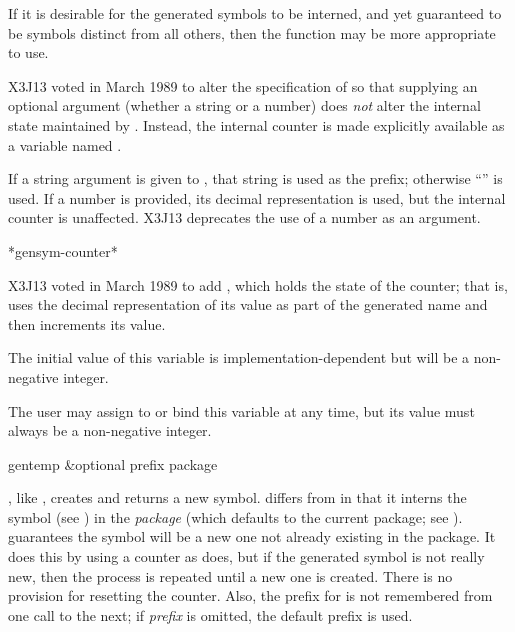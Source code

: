 \begin{defun}[Function]
If it is desirable
for the generated symbols to be interned, and yet guaranteed to be
symbols distinct from all others,
then the function 
may be more appropriate to use.

\begin{newer}
X3J13 voted in March 1989 
to alter the specification of  so that supplying an
optional argument (whether a string or a number) does {\it not} alter
the internal state maintained by .
Instead, the internal
counter is made explicitly available as a variable named .

If a string argument is given to , that string is used as the prefix;
otherwise ``'' is used.  If a number is provided, its decimal
representation is used, but the internal counter is unaffected.
X3J13 deprecates the use of a number as an argument.
\end{newer}
\end{defun}

\begin{newer}
\begin{defun}[Variable]
*gensym-counter*

X3J13 voted in March 1989 
to add , which
holds the state of the  counter; that is, 
uses the decimal representation of its value as part of the generated name
and then increments its value.

The initial value of this variable is implementation-dependent
but will be a non-negative integer.

The user may assign to or bind this variable at any time, but its value
must always be a non-negative integer.
\end{defun}
\end{newer}

\begin{defun}[Function]
gentemp &optional prefix package

, like , creates and returns a new symbol.
 differs from  in that it interns the symbol
(see ) in the {\it package} (which defaults to the current
package; see ).   guarantees the symbol
will be a new one not already existing in the package.  It does this
by using a counter as  does, but if the generated symbol
is not really new, then the process is repeated until a new one is created.
There is no provision for resetting the  counter.
Also, the prefix for  is not remembered from one call
to the next; if {\it prefix} is omitted, the default prefix  is used.
\end{defun}

